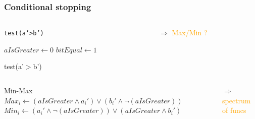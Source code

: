 \documentclass{beamer}
\begin{document}
\begin{frame} 
 \frametitle{Conditional stopping }
\linesnumbered 
\begin{columns}
\begin{column}[c]{8cm}

\begin{block}{\texttt{test(a'>b')}}
\begin{algorithm}[H]

\SetVline
 $aIsGreater \leftarrow 0$\;
 $bitEqual \leftarrow 1$\;
	

\caption{test(a'$>$b')\label{Code:algo}}
\end{algorithm}
\end{block}
\end{column}
\begin{column}[c]{3cm}
 $\Rightarrow$ \textcolor{orange}{Max/Min ?}
\end{column}
\end{columns} 

\begin{columns}
\begin{column}[c]{8cm}
\begin{block}{Min-Max}
 $Max_i \leftarrow (aIsGreater \wedge a_i') \vee (b_i'\wedge \neg(aIsGreater))$ \;
 $Min_i \leftarrow  (a_i' \wedge \neg(aIsGreater) ) \vee (aIsGreater \wedge b_i')$ \;
\end{block}
\end{column}
\begin{column}[c]{2cm}
$\Rightarrow$ \textcolor{orange}{spectrum of funcs}
\end{column}
\end{columns}
\end{frame}
\end{document}
